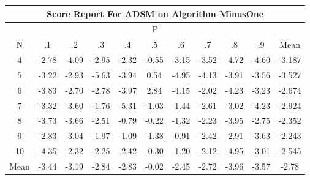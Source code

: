 \documentclass[11pt,a4paper]{report}
\begin{document}
\begin{longtable}{ | c || c | c | c | c | c | c | c | c | c || c |}
\hline
\multicolumn{11}{|c|}{ Score Report For ADSM on Algorithm MinusOne} \\
\hline
\multicolumn{11}{|c|}{ P } \\
\hline
N & .1 & .2 & .3 & .4 & .5 & .6 & .7 & .8 & .9 & Mean\\
 \hline
 \hline
 \endhead
  4 &  \cellcolor[HTML]{FFB7B7} -2.78 &  \cellcolor[HTML]{FF9797} -4.09 &  \cellcolor[HTML]{FFB7B7} -2.95 &  \cellcolor[HTML]{FFC7C7} -2.32 &  \cellcolor[HTML]{FFEFEF} -0.55 &  \cellcolor[HTML]{FFAFAF} -3.15 &  \cellcolor[HTML]{FFA7A7} -3.52 &  \cellcolor[HTML]{FF8787} -4.72 &  \cellcolor[HTML]{FF8F8F} -4.60 & -3.187 \\
  5 &  \cellcolor[HTML]{FFAFAF} -3.22 &  \cellcolor[HTML]{FFB7B7} -2.93 &  \cellcolor[HTML]{FF7070} -5.63 &  \cellcolor[HTML]{FF9F9F} -3.94 &  \cellcolor[HTML]{EFEFFF} 0.54 &  \cellcolor[HTML]{FF8080} -4.95 &  \cellcolor[HTML]{FF9797} -4.13 &  \cellcolor[HTML]{FF9F9F} -3.91 &  \cellcolor[HTML]{FFA7A7} -3.56 & -3.527 \\
  6 &  \cellcolor[HTML]{FF9F9F} -3.83 &  \cellcolor[HTML]{FFB7B7} -2.70 &  \cellcolor[HTML]{FFB7B7} -2.78 &  \cellcolor[HTML]{FF9F9F} -3.97 &  \cellcolor[HTML]{B7B7FF} 2.84 &  \cellcolor[HTML]{FF9797} -4.15 &  \cellcolor[HTML]{FFCFCF} -2.02 &  \cellcolor[HTML]{FF9797} -4.23 &  \cellcolor[HTML]{FFAFAF} -3.23 & -2.674 \\
  7 &  \cellcolor[HTML]{FFAFAF} -3.32 &  \cellcolor[HTML]{FFA7A7} -3.60 &  \cellcolor[HTML]{FFCFCF} -1.76 &  \cellcolor[HTML]{FF7878} -5.31 &  \cellcolor[HTML]{FFE7E7} -1.03 &  \cellcolor[HTML]{FFD7D7} -1.44 &  \cellcolor[HTML]{FFBFBF} -2.61 &  \cellcolor[HTML]{FFAFAF} -3.02 &  \cellcolor[HTML]{FF9797} -4.23 & -2.924 \\
  8 &  \cellcolor[HTML]{FF9F9F} -3.73 &  \cellcolor[HTML]{FF9F9F} -3.66 &  \cellcolor[HTML]{FFBFBF} -2.51 &  \cellcolor[HTML]{FFEFEF} -0.79 &  \cellcolor[HTML]{FFF7F7} -0.22 &  \cellcolor[HTML]{FFDFDF} -1.32 &  \cellcolor[HTML]{FFC7C7} -2.23 &  \cellcolor[HTML]{FF9F9F} -3.95 &  \cellcolor[HTML]{FFB7B7} -2.75 & -2.352 \\
  9 &  \cellcolor[HTML]{FFB7B7} -2.83 &  \cellcolor[HTML]{FFAFAF} -3.04 &  \cellcolor[HTML]{FFCFCF} -1.97 &  \cellcolor[HTML]{FFE7E7} -1.09 &  \cellcolor[HTML]{FFDFDF} -1.38 &  \cellcolor[HTML]{FFE7E7} -0.91 &  \cellcolor[HTML]{FFBFBF} -2.42 &  \cellcolor[HTML]{FFB7B7} -2.91 &  \cellcolor[HTML]{FFA7A7} -3.63 & -2.243 \\
  10 &  \cellcolor[HTML]{FF8F8F} -4.35 &  \cellcolor[HTML]{FFC7C7} -2.32 &  \cellcolor[HTML]{FFC7C7} -2.25 &  \cellcolor[HTML]{FFBFBF} -2.42 &  \cellcolor[HTML]{FFF7F7} -0.30 &  \cellcolor[HTML]{FFDFDF} -1.20 &  \cellcolor[HTML]{FFC7C7} -2.12 &  \cellcolor[HTML]{FF8080} -4.95 &  \cellcolor[HTML]{FFB7B7} -3.01 & -2.545 \\
 \hline
 \hline
Mean &  \cellcolor[HTML]{FFA7A7} -3.44 &  \cellcolor[HTML]{FFAFAF} -3.19 &  \cellcolor[HTML]{FFB7B7} -2.84 &  \cellcolor[HTML]{FFB7B7} -2.83 &  \cellcolor[HTML]{FFFFFF} -0.02 &  \cellcolor[HTML]{FFBFBF} -2.45 &  \cellcolor[HTML]{FFB7B7} -2.72 &  \cellcolor[HTML]{FF9F9F} -3.96 &  \cellcolor[HTML]{FFA7A7} -3.57 &  \cellcolor[HTML]{FFB7B7} -2.78
\end{longtable}
\end{document}
